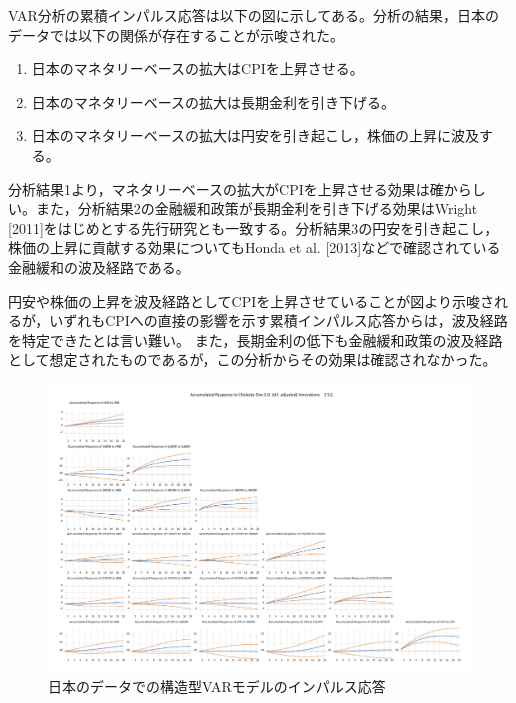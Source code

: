 \documentclass[12pt]{jarticle}
\begin{document}
{VAR分析の累積インパルス応答は以下の図に示してある。分析の結果，日本のデータでは以下の関係が存在することが示唆された。

\begin{enumerate}
  \setlength{\leftskip}{30pt}
  \item 日本のマネタリーベースの拡大はCPIを上昇させる。
  \item 日本のマネタリーベースの拡大は長期金利を引き下げる。
  \item 日本のマネタリーベースの拡大は円安を引き起こし，株価の上昇に波及する。
\end{enumerate}

分析結果1より，マネタリーベースの拡大がCPIを上昇させる効果は確からしい。また，分析結果2の金融緩和政策が長期金利を引き下げる効果はWright [2011]をはじめとする先行研究とも一致する。分析結果3の円安を引き起こし，株価の上昇に貢献する効果についてもHonda et al. [2013]などで確認されている金融緩和の波及経路である。

円安や株価の上昇を波及経路としてCPIを上昇させていることが図より示唆されるが，いずれもCPIへの直接の影響を示す累積インパルス応答からは，波及経路を特定できたとは言い難い。
また，長期金利の低下も金融緩和政策の波及経路として想定されたものであるが，この分析からその効果は確認されなかった。

\newpage
\begin{figure}[!htbp]
  \caption{日本のデータでの構造型VARモデルのインパルス応答}
  \begin{center}
    \includegraphics[width=18cm]{jimpulse.pdf}
  \end{center}
\end{figure}

}
\end{document}
